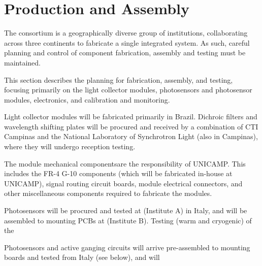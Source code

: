 \section{Production and Assembly}
\label{sec:fdsp-pd-prod-assy}
The \single {} consortium is a geographically diverse group of institutions, collaborating across three continents to fabricate a single integrated system.  As such, careful planning and control of component fabrication, assembly and testing must be maintained.

This section describes the planning for fabrication, assembly, and testing, focusing primarily on the  light collector modules, photosensors and photosensor modules, electronics, and calibration and monitoring.

 

Light collector modules will be fabricated primarily in Brazil.  Dichroic filters and wavelength shifting plates will be procured and received by a combination of CTI Campinas and the National Laboratory of Synchrotron Light (also in Campinas), where they will undergo reception  testing.

The module mechanical componentsare the responsibility of UNICAMP.  This includes the FR-4 G-10 components (which will be fabricated in-house at UNICAMP), signal routing circuit boards, module electrical connectors, and other miscellaneous components required to fabricate the modules.  

Photosensors will be procured and tested at (Institute A) in Italy, and will be assembled to mounting PCBs at (Institute B).  Testing (warm and cryogenic) of the 

Photosensors and active ganging circuits will arrive pre-assembled to mounting boards and tested from Italy (see below), and will 

